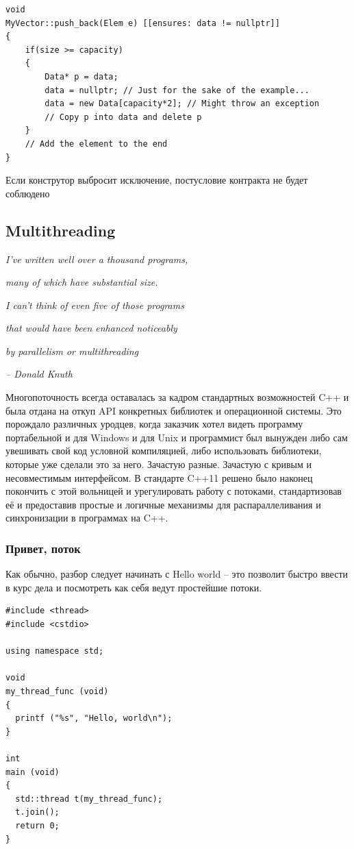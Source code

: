 \documentclass[a4paper,12pt,oneside]{article}
\begin{document}
\begin{lstlisting}
void 
MyVector::push_back(Elem e) [[ensures: data != nullptr]]
{
    if(size >= capacity)
    {
        Data* p = data;
        data = nullptr; // Just for the sake of the example...
        data = new Data[capacity*2]; // Might throw an exception
        // Copy p into data and delete p
    }
    // Add the element to the end
}
\end{lstlisting}

Если конструтор выбросит исключение, постусловие контракта не будет соблюдено

\pagebreak
\subsection{Multithreading}

\hfill\textit{I’ve written well over a thousand programs,}

\hfill\textit{many of which have substantial size.}

\hfill\textit{I can’t think of even five of those programs}

\hfill\textit{that would have been enhanced noticeably}

\hfill\textit{by parallelism or multithreading}{\vspace{0.5em}}

\hfill\textit{-- Donald Knuth}

Многопоточность всегда оставалась за кадром стандартных возможностей C++ и была отдана на откуп API конкретных библиотек и операционной системы. Это порождало различных уродцев, когда заказчик хотел видеть программу портабельной и для Windows и для Unix и программист был вынужден либо сам увешивать свой код условной компиляцией, либо использовать библиотеки, которые уже сделали это за него. Зачастую разные. Зачастую с кривым и несовместимым интерфейсом. В стандарте C++11 решено было наконец покончить с этой вольницей и урегулировать работу с потоками, стандартизовав её и предоставив простые и логичные механизмы для распараллеливания и синхронизации в программах на C++.

\subsubsection{Привет, поток}

Как обычно, разбор следует начинать с Hello world -- это позволит быстро ввести в курс дела и посмотреть как себя ведут простейшие потоки.

\begin{lstlisting}
#include <thread>
#include <cstdio>

using namespace std;

void 
my_thread_func (void)
{
  printf ("%s", "Hello, world\n");
}

int 
main (void)
{
  std::thread t(my_thread_func);
  t.join();
  return 0;
}
\end{lstlisting}
\end{document}
